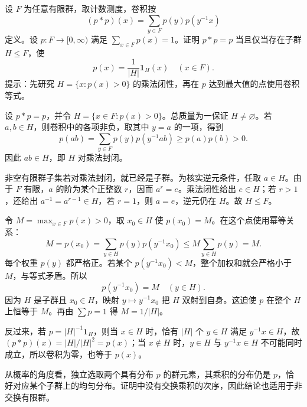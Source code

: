 \begin{exercise}[幂等概率与子群上的均匀分布]
\label{b2:ex:I1-idempotent-probability}
设 \(F\) 为任意有限群，取计数测度，卷积按
\[
 (p*p)(x)=\sum_{y\in F}p(y)p(y^{-1}x)
\]
定义。设 \(p:F\rightarrow[0,\infty)\) 满足 \(\sum_{x\in F}p(x)=1\)。证明 \(p*p=p\) 当且仅当存在子群 \(H\le F\)，使
\[
 p(x)=\frac1{|H|}\mathbf1_H(x)\quad(x\in F).
\]
提示：先研究 \(H=\{x:p(x)>0\}\) 的乘法闭性，再在 \(p\) 达到最大值的点使用卷积等式。
\end{exercise}
\begin{solution}
设 \(p*p=p\)，并令 \(H=\{x\in F:p(x)>0\}\)。总质量为一保证 \(H\ne\varnothing\)。若 \(a,b\in H\)，则卷积中的各项非负，取其中 \(y=a\) 的一项，得到
\[
 p(ab)=\sum_{y\in F}p(y)p(y^{-1}ab)
 \ge p(a)p(b)>0.
\]
因此 \(ab\in H\)，即 \(H\) 对乘法封闭。

非空有限群子集若对乘法封闭，就已经是子群。为核实逆元条件，任取 \(a\in H\)。由于 \(F\) 有限，\(a\) 的阶为某个正整数 \(r\)，因而 \(a^r=e\)。乘法闭性给出 \(e\in H\)；若 \(r>1\)，还给出 \(a^{-1}=a^{r-1}\in H\)，若 \(r=1\)，则 \(a=e\)，逆元仍在 \(H\)。故 \(H\le F\)。

令 \(M=\max_{x\in F}p(x)>0\)，取 \(x_0\in H\) 使 \(p(x_0)=M\)。在这个点使用幂等关系：
\[
 M=p(x_0)=\sum_{y\in H}p(y)p(y^{-1}x_0)
 \le M\sum_{y\in H}p(y)=M.
\]
每个权重 \(p(y)\) 都严格正。若某个 \(p(y^{-1}x_0)<M\)，整个加权和就会严格小于 \(M\)，与等式矛盾。所以
\[
 p(y^{-1}x_0)=M\quad(y\in H).
\]
因为 \(H\) 是子群且 \(x_0\in H\)，映射 \(y\mapsto y^{-1}x_0\) 把 \(H\) 双射到自身。这迫使 \(p\) 在整个 \(H\) 上恒等于 \(M\)。再由 \(\sum p=1\) 得 \(M=1/|H|\)。

反过来，若 \(p=|H|^{-1}\mathbf1_H\)，则当 \(x\in H\) 时，恰有 \(|H|\) 个 \(y\in H\) 满足 \(y^{-1}x\in H\)，故 \((p*p)(x)=|H|/|H|^2=p(x)\)；当 \(x\notin H\) 时，\(y\in H\) 与 \(y^{-1}x\in H\) 不可能同时成立，所以卷积为零，也等于 \(p(x)\)。

从概率的角度看，独立选取两个具有分布 \(p\) 的群元素，其乘积的分布仍是 \(p\)，恰好对应某个子群上的均匀分布。证明中没有交换乘积的次序，因此结论也适用于非交换有限群。
\end{solution}


